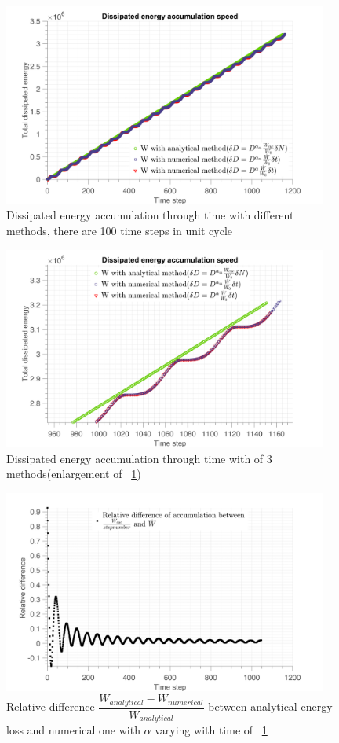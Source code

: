\documentclass[3p,times,procedia,number]{elsarticle}
\newcommand{\figref}[1]{\figurename~\ref{#1}}
\begin{document}
\begin{figure}[!h]
	\centering
	\includegraphics[width=0.95\textwidth]{figures//W_3methods2_100steps.png} 
	\caption{Dissipated energy accumulation through time with different methods, there are 100 time steps in unit cycle}
	\label{fig.W3methods100}
\end{figure}
\begin{figure}[!h]
	\centering
	\includegraphics[width=0.95\textwidth]{figures//W_3methods_100steps_enlarge.png} 
	\caption{Dissipated energy accumulation through time with of 3 methods(enlargement of \figref{fig.W3methods100})}
	\label{fig.W3methods2enlarge}
\end{figure}
\begin{figure}[!h]
	\centering
	\includegraphics[width=0.95\textwidth]{figures//W_3methods_diff_100steps.png} 
	\caption{Relative difference $\dfrac{W_{analytical}-W_{numerical}}{W_{analytical}}$ between analytical energy loss and numerical one with $\alpha$ varying with time of \figref{fig.W3methods100}}
	\label{fig.W3methodsdiff}
\end{figure}
\end{document}
